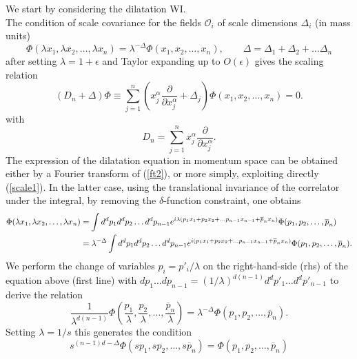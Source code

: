 \documentclass[a4paper,11pt,openright,twoside]{book}
\numberwithin{equation}{section}
\begin{document}
We start by considering the dilatation WI. \\
The condition of scale covariance for the fields $\mathcal{O}_i$ of scale dimensions $\Delta_i$ (in mass units)
\begin{equation}
	\label{scale1}
	\Phi(\lambda x_1,\lambda x_2,\ldots,\lambda x_n)=\lambda^{-\Delta} \Phi(x_1,x_2,\ldots, x_n), \qquad 
	\Delta=\Delta_1 +\Delta_2 +\ldots \Delta_n
\end{equation}
after setting $\lambda=1 +\epsilon$ and Taylor expanding up to $O(\epsilon)$ gives the 
scaling relation 
\begin{equation}
	\label{ft2}
	(D_n + \Delta)\Phi\equiv \sum_{j=1}^n \left(x_j^\alpha \frac{\partial}{\partial x_j^\alpha} +\Delta_j\right) \Phi(x_1,x_2,\ldots,x_n) =0.
\end{equation}
with 
\begin{equation}
	D_n=\sum_{j=1}^n x_j^\alpha\frac{\partial}{\partial x_j^\alpha}. 
\end{equation}
The expression of the dilatation equation in momentum space can be obtained either by a Fourier transform 
of (\ref{ft2}), or more simply, exploiting directly (\ref{scale1}). In the latter case, using the translational invariance of the correlator under the integral, by removing the $\delta$-function constraint, one obtains
\begin{align}
	\Phi(\lambda x_1,\lambda x_2,\ldots,\lambda x_n)&= \int d^d p_1 d^d p_2\ldots d^d p_{n-1} e^{i\lambda (p_1 x_1 + p_2 x_2 +...p_{n-1} x_{n-1} + 
		\overline{p}_n x_n)}\Phi(p_1,p_2,\ldots,\overline{p}_n)\notag \\
	&=\lambda^{-\Delta}  \int d^d p_1 d^d p_2\ldots d^d p_{n-1} e^{i(p_1 x_1 + p_2 x_2 +...p_{n-1} x_{n-1} + 
		\overline{p}_n x_n)}\Phi(p_1,p_2,\ldots,\overline{p}_n).
\end{align}
We perform the change of variables $ p_i=p'_i/\lambda$ on the right-hand-side (rhs) of the equation above (first line) with $d p_1...d p_{n-1}=(1/\lambda)^{d(n-1)} d^d p'_1 \ldots d^d p'_{n-1}$ to derive the relation 
\begin{equation}
	\frac{1}{{\lambda}^{d(n-1)}}\Phi\left(\frac{p_1}{\lambda},\frac{p_2}{\lambda},\ldots,\frac{\overline{p}_n}{\lambda}\right)=\lambda^{-\Delta} \Phi(p_1,p_2,\ldots,\overline{p}_n).
\end{equation}
Setting $\lambda=1/s$ this generates the condition
\begin{equation}
	s^{(n-1) d-\Delta}\Phi(s p_1,s p_2,\ldots, s \overline{p}_n)=\Phi(p_1,p_2,\ldots,\overline{p}_n)
\end{equation}
\end{document}
